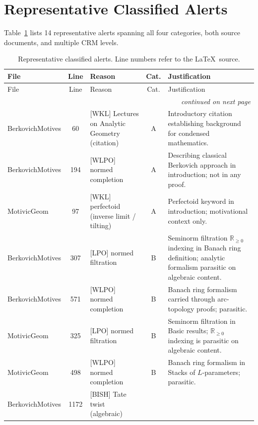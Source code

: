 \documentclass[11pt]{article}
\newcommand{\BISH}{\textsf{BISH}}
\newcommand{\WKL}{\textsf{WKL}}
\newcommand{\WLPO}{\textsf{WLPO}}
\newcommand{\LPO}{\textsf{LPO}}
\begin{document}
\section{Representative Classified Alerts}
\label{sec:samples}

Table~\ref{tab:samples} lists 14 representative alerts spanning all four
categories, both source documents, and multiple CRM levels.

\begin{longtable}{@{}p{2.0cm}cp{2.8cm}cp{5.5cm}@{}}
\caption{Representative classified alerts.  Line numbers refer to the
  \LaTeX\ source.}
\label{tab:samples} \\
\toprule
File & Line & Reason & Cat. & Justification \\
\midrule
\endfirsthead
\toprule
File & Line & Reason & Cat. & Justification \\
\midrule
\endhead
\midrule
\multicolumn{5}{r}{\emph{continued on next page}} \\
\bottomrule
\endfoot
\bottomrule
\endlastfoot
%
%
Berkovich\-Motives & 60
  & [\WKL] Lectures on Analytic Geometry (citation)
  & A
  & Introductory citation establishing background for condensed mathematics. \\
%
Berkovich\-Motives & 194
  & [\WLPO] normed completion
  & A
  & Describing classical Berkovich approach in introduction; not in any proof. \\
%
Motivic\-Geom & 97
  & [\WKL] perfectoid (inverse limit / tilting)
  & A
  & Perfectoid keyword in introduction; motivational context only. \\
\midrule
%
%
Berkovich\-Motives & 307
  & [\LPO] normed filtration
  & B
  & Seminorm filtration $\mathbb{R}_{\geq 0}$ indexing in Banach ring definition;
    analytic formalism parasitic on algebraic content. \\
%
Berkovich\-Motives & 571
  & [\WLPO] normed completion
  & B
  & Banach ring formalism carried through arc-topology proofs; parasitic. \\
%
Motivic\-Geom & 325
  & [\LPO] normed filtration
  & B
  & Seminorm filtration in Basic results; $\mathbb{R}_{\geq 0}$ indexing
    is parasitic on algebraic content. \\
%
Motivic\-Geom & 498
  & [\WLPO] normed completion
  & B
  & Banach ring formalism in Stacks of $L$-parameters; parasitic. \\
\midrule
%
%
Berkovich\-Motives & 1172
  & [\BISH] Tate twist (algebraic)

\end{longtable}
\end{document}
